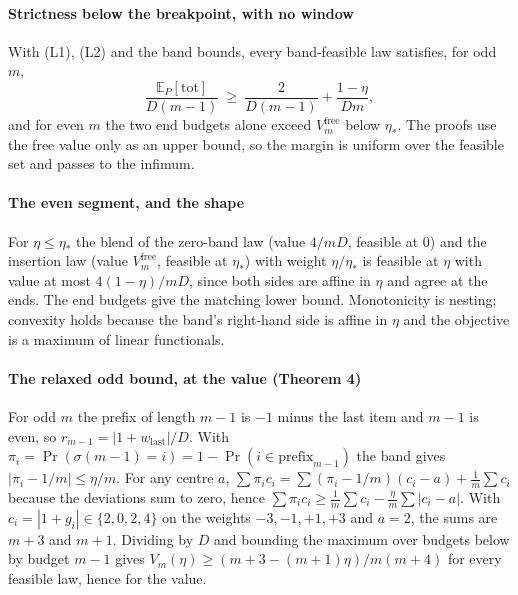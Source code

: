 \paragraph{Strictness below the breakpoint, with no window} With (L1), (L2) and the band
bounds, every band-feasible law satisfies, for odd $m$,
\[
\frac{\mathbb{E}_{P}[\mathrm{tot}]}{D(m-1)}\ \ge\ \frac{2}{D(m-1)}+\frac{1-\eta}{Dm},
\]
and for even $m$ the two end budgets alone exceed $V^{\mathrm{free}}_{m}$ below $\eta_{*}$.
The proofs use the free value only as an upper bound, so the margin is uniform over the
feasible set and passes to the infimum.


\paragraph{The even segment, and the shape} For $\eta\le\eta_{*}$ the blend of the zero-band
law (value $4/mD$, feasible at $0$) and the insertion law (value $V^{\mathrm{free}}_{m}$,
feasible at $\eta_{*}$) with weight $\eta/\eta_{*}$ is feasible at $\eta$ with value at most
$4(1-\eta)/mD$, since both sides are affine in $\eta$ and agree at the ends. The end budgets
give the matching lower bound. Monotonicity is nesting; convexity holds because the band's
right-hand side is affine in $\eta$ and the objective is a maximum of linear functionals.


\paragraph{The relaxed odd bound, at the value (Theorem 4)} For odd $m$ the prefix of
length $m-1$ is $-1$ minus the last item and $m-1$ is even, so
$r_{m-1}=|1+w_{\mathrm{last}}|/D$. With $\pi_{i}=\Pr(\sigma(m-1)=i)=1-\Pr(i\in
\mathrm{prefix}_{m-1})$ the band gives $|\pi_{i}-1/m|\le\eta/m$. For any centre $a$,
$\sum\pi_{i}c_{i}=\sum(\pi_{i}-1/m)(c_{i}-a)+\frac1m\sum c_{i}$ because the deviations sum
to zero, hence $\sum\pi_{i}c_{i}\ge\frac1m\sum c_{i}-\frac\eta m\sum|c_{i}-a|$. With
$c_{i}=|1+g_{i}|\in\{2,0,2,4\}$ on the weights $-3,-1,+1,+3$ and $a=2$, the sums are $m+3$
and $m+1$. Dividing by $D$ and bounding the maximum over budgets below by budget $m-1$ gives
$V_{m}(\eta)\ge(m+3-(m+1)\eta)/m(m+4)$ for every feasible law, hence for the value.

